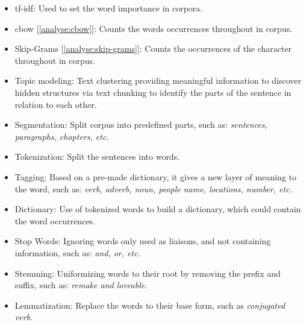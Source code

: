 \begin{itemize}
    \setlength\itemsep{0em}
    \item \gls{tf-idf}: Used to set the word importance in corpora.
    \item \gls{cbow} [\ref{analyse:cbow}]: Counts the words occurrences throughout in corpus.
    \item Skip-Grams [\ref{analyse:skip-grams}]: Counts the occurrences of the character throughout in corpus.
    \item Topic modeling: Text clustering providing meaningful information to discover hidden structures via text chunking to identify the parts of the sentence in relation to each other.
    \item Segmentation: Split corpus into predefined parts, such as: \textit{sentences, paragraphs, chapters, etc.}
    \item Tokenization: Split the sentences into words.
    \item Tagging: Based on a pre-made dictionary, it gives a new layer of meaning to the word, such as: \textit{verb, adverb, noun, people name, locations, number, etc.}
    \item Dictionary: Use of tokenized words to build a dictionary, which could contain the word occurrences.
    \item Stop Words: Ignoring words only used as liaisons, and not containing information, such as: \textit{and, or, etc.}
    \item Stemming: Uniformizing words to their root by removing the prefix and suffix, such as: \textit{remake and loveable}.
    \item Lemmatization: Replace the words to their base form, such as \textit{conjugated verb}.
\end{itemize}
